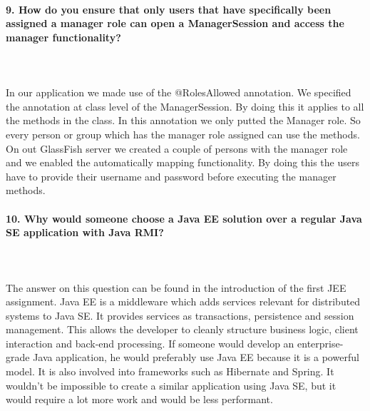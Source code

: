 \documentclass{ds-report}
\begin{document}
	\paragraph{9. How do you ensure that only users that have specifically been assigned a manager role can open a ManagerSession and access the manager functionality?} \mbox{}\\\\
In our application we made use of the @RolesAllowed annotation. We specified the annotation at class level of the ManagerSession. By doing this it applies to all the methods in the class. In this annotation we only putted the Manager role. So every person or group which has the manager role assigned can use the methods.
On out GlassFish server we created a couple of persons with the manager role and we enabled the automatically mapping functionality. By doing this the users have to provide their username and password before executing the manager methods. 
	
	
	\paragraph{10.  Why would someone choose a Java EE solution over a regular Java SE application with Java RMI?} \mbox{}\\\\
The answer on this question can be found in the introduction of the first JEE assignment. Java EE is a middleware which adds services relevant for distributed systems to Java SE. It provides services as transactions, persistence and session management. This allows the developer to cleanly structure business logic, client interaction and back-end processing.
If someone would develop an enterprise-grade Java application, he would preferably use Java EE because it is a powerful model. It is also involved into frameworks such as Hibernate and Spring. It wouldn't be impossible to create a similar application using Java SE, but it would require a lot more work and would be less performant. 


	
	\clearpage

	
\end{document}
